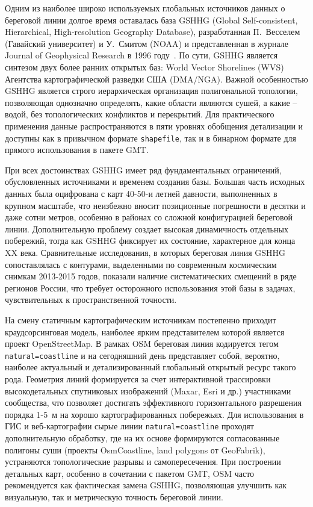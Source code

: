 Одним из наиболее широко используемых глобальных источников данных о береговой линии долгое время оставалась база GSHHG (Global Self-consistent, Hierarchical, High-resolution Geography Database), разработанная П.~Весселем (Гавайский университет) и У.~Смитом (NOAA) и представленная в журнале Journal of Geophysical Research в 1996 году~\cite{WesselSmith1996GSHHG}. 
По сути, GSHHG является синтезом двух более ранних открытых баз: World Vector Shorelines (WVS) Агентства картографической разведки США (DMA/NGA).
Важной особенностью GSHHG является строго иерархическая организация полигональной топологии, позволяющая однозначно определять, какие области являются сушей, а какие -- водой, без топологических конфликтов и перекрытий. 
Для практического применения данные распространяются в пяти уровнях обобщения детализации и доступны как в привычном формате \texttt{shapefile}, так и в бинарном формате для прямого использования в пакете GMT.

При всех достоинствах GSHHG имеет ряд фундаментальных ограничений, обусловленных источниками и временем создания базы. 
Большая часть исходных данных была оцифрована с карт 40-50-и летней давности, выполненных в крупном масштабе, что неизбежно вносит позиционные погрешности в десятки и даже сотни метров, особенно в районах со сложной конфигурацией береговой линии. 
Дополнительную проблему создает высокая динамичность отдельных побережий, тогда как GSHHG фиксирует их состояние, характерное для конца XX века.
Сравнительные исследования, в которых береговая линия GSHHG сопоставлялась с контурами, выделенными по современным космическим снимкам 2013-2015 годов, показали наличие систематических смещений в ряде регионов России, что требует осторожного использования этой базы в задачах, чувствительных к пространственной точности.

На смену статичным картографическим источникам постепенно приходит краудсорсинговая модель, наиболее ярким представителем которой является проект OpenStreetMap. 
В рамках OSM береговая линия кодируется тегом \texttt{natural=coastline} и на сегодняшний день представляет собой, вероятно, наиболее актуальный и детализированный глобальный открытый ресурс такого рода. 
Геометрия линий формируется за счет интерактивной трассировки высокодетальных спутниковых изображений (Maxar, Esri и др.) участниками сообщества, что позволяет достигать эффективного горизонтального разрешения порядка 1-5~м на хорошо картографированных побережьях. 
Для использования в ГИС и веб-картографии сырые линии \texttt{natural=coastline} проходят дополнительную обработку, где на их основе формируются согласованные полигоны суши (проекты OsmCoastline, land polygons от GeoFabrik), устраняются топологические разрывы и самопересечения. 
При построении детальных карт, особенно в сочетании с пакетом GMT, OSM часто рекомендуется как фактическая замена GSHHG, позволяющая улучшить как визуальную, так и метрическую точность береговой линии.

